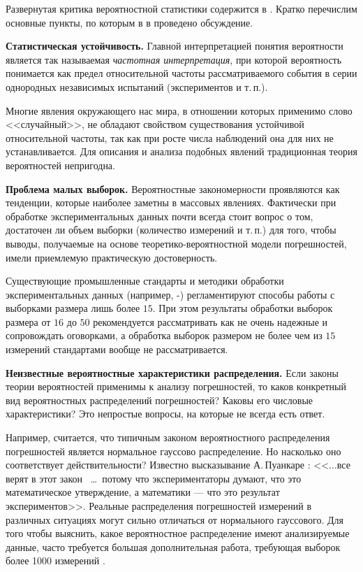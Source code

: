 \documentclass[a5paper,openany]{book}
\begin{document}
{{Развернутая критика вероятностной статистики  содержится в  \cite{MetodikaBook}. Кратко перечислим основные пункты, по которым в  в  \cite{MetodikaBook} проведено обсуждение.

{\bf Статистическая устойчивость.} 
Главной интерпретацией   
понятия вероятности является так называемая \emph{частотная интерпретация}, при 
которой вероятность понимается как предел относительной частоты рассматриваемого 
события в серии однородных независимых испытаний (экспериментов и т.\,п.). 

Многие явления окружающего нас мира, в отношении которых применимо слово <<случайный>>, не обладают свойством существования устойчивой относительной 
частоты, так как при росте числа наблюдений она для них не устанавливается. 
Для описания и анализа подобных явлений традиционная теория вероятностей непригодна. 

{\bf Проблема малых выборок.} 
Вероятностные закономерности проявляются как тенденции, которые наиболее заметны 
в массовых явлениях.  Фактически
при обработке экспериментальных данных почти всегда стоит вопрос о том, достаточен ли 
объем выборки (количество измерений и т.\,п.) для того, чтобы выводы, получаемые 
на основе теоретико-вероятностной модели погрешностей, имели приемлемую практическую 
достоверность. 

Существующие промышленные стандарты и методики обработки экспериментальных данных (например, \cite{GUM} -\cite{GOSTDirect}) регламентируют способы работы с выборками размера лишь 
более $15$. При этом результаты обработки выборок размера от $16$ до $50$ рекомендуется 
рассматривать как не очень надежные и сопровождать оговорками, а обработка выборок 
размером не более чем из $15$ измерений стандартами вообще не рассматривается. 

{\bf Неизвестные вероятностные характеристики распределения.} 
Если законы теории вероятностей применимы к анализу погрешностей, то каков конкретный 
вид вероятностных распределений погрешностей? Каковы его числовые характеристики? 
Это непростые вопросы, на которые  не всегда есть ответ.

Например, считается, что типичным законом вероятностного распределения погрешностей 
является нормальное гауссово распределение. Но насколько оно соответствует действительности?   
Известно высказывание А.\,Пуанкаре  \cite{Poincare}: <<$\ldots$все верят в этот закон  ~\ldots\,  потому что экспериментаторы думают, 
что это математическое утверждение, а математики --- что это результат экспериментов>>.  
Реальные 
распределения погрешностей измерений в различных ситуациях могут сильно отличаться 
от нормального гауссового.
Для того чтобы выяснить, какое вероятностное распределение имеют 
анализируемые данные, часто требуется большая дополнительная работа, требующая выборок более 1000 измерений \cite{Orlov2016}. 

}}
\end{document}
